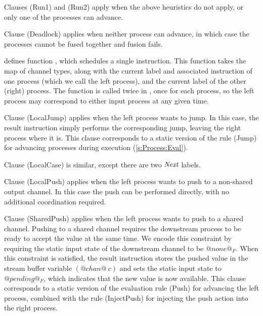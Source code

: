 Clauses (Run1) and (Run2) apply when the above heuristics do not apply, or only one of the processes can advance.

Clause (Deadlock) applies when neither process can advance, in which case the processes cannot be fused together and fusion fails.




\smallskip
{} defines function , which schedules a single instruction.
This function takes the map of channel types, along with the current label and associated instruction of one process (which we call the left process), and the current label of the other (right) process.
The  function is called twice in , once for each process, so the left process may correspond to either input process at any given time.


Clause (LocalJump) applies when the left process wants to jump.
In this case, the result instruction simply performs the corresponding jump, leaving the right process where it is.
This clause corresponds to a static version of the rule (Jump) for advancing processes during execution (\cref{s:Process:Eval}).

Clause (LocalCase) is similar, except there are two $\textit{Next}$ labels.

Clause (LocalPush) applies when the left process wants to push to a non-shared output channel.
In this case the push can be performed directly, with no additional coordination required.

Clause (SharedPush) applies when the left process wants to push to a shared channel.
Pushing to a shared channel requires the downstream process to be ready to accept the value at the same time.
We encode this constraint by requiring the static input state of the downstream channel to be $@none@_F$.
When this constraint is satisfied, the result instruction stores the pushed value in the stream buffer variable $(@chan@~c)$ and sets the static input state to $@pending@_F$, which indicates that the new value is now available.
This clause corresponds to a static version of the evaluation rule (Push) for advancing the left process, combined with the rule (InjectPush) for injecting the push action into the right process.

